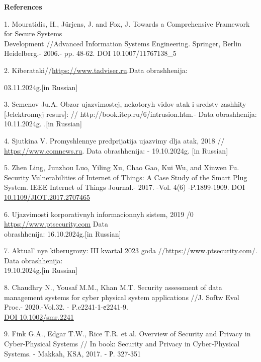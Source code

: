 \begin{center}
{\bfseries References}
\end{center}

\begin{references}
1. Mouratidis, H., Jürjens, J. and Fox, J. Towards a Comprehensive
Framework for Secure Systems \\Development //Advanced Information Systems
Engineering. Springer, Berlin Heidelberg.- 2006.- pp. 48-62. DOI
10.1007/11767138\_5

2. Kiberataki//\href{https://www.tadviser.ru/index.php/Stat'ja:Kiberataki}{https://www.tadviser.ru}.Data obrashhenija:

03.11.2024g.{[}in Russian{]}

3. Semenov Ju.A. Obzor ujazvimostej, nekotoryh vidov atak i sredstv
zashhity {[}Jelektronnyj resurs{]}: //
http://book.itep.ru/6/intrusion.htm.- Data obrashhenija: 10.11.2024g.
.{[}in Russian{]}

4. Sjutkina V. Promyshlennye predprijatija ujazvimy dlja atak, 2018 //
\href{https://www.comnews.ru/content/112938/2018-05-07/promyshlennye-predpriyatiya-uyazvimy-dlya-atak}{https://www.comnews.ru}.
Data obrashhenija: - 19.10.2024g. {[}in Russian{]}

5. Zhen Ling, Junzhou Luo, Yiling Xu, Chao Gao, Kui Wu, and Xinwen Fu.
Security Vulnerabilities of Internet of Things: A Case Study of the
Smart Plug System. IEEE Internet of Things Journal.- 2017. -Vol. 4(6)
-P.1899-1909. DOI
\href{https://doi.org/10.1109/JIOT.2017.2707465}{10.1109/JIOT.2017.2707465}

6. Ujazvimosti korporativnyh informacionnyh sistem, 2019 /0
\href{https://www.ptsecurity.com/ru-ru/research/analytics/corporate-vulnerabilities-2019}{https://www.ptsecurity.com}
Data \\obrashhenija: 16.10.2024g.{[}in Russian{]}

7. Aktual' nye kiberugrozy: III kvartal 2023 goda
//\href{https://www.ptsecurity.com/ru-ru/research/analytics/cybersecurity-threatscape-2023-q3}{https://www.ptsecurity.com}/.
Data obrashhenija: \\19.10.2024g.{[}in Russian{]}

8. Chaudhry N., Yousaf M.M., Khan M.T. Security assessment of data
management systems for cyber physical system applications //J. Softw
Evol Proc.- 2020.-Vol.32. - P.e2241-1-е2241-9.\\
\href{https://doi.org/10.1002/smr.2241}{DOI 10.1002/smr.2241}

9. Fink G.A., Edgar T.W., Rice T.R. et al. Overview of Security and
Privacy in Cyber‐Physical Systems // In book: Security and Privacy in
Cyber‐Physical Systems. - Makkah, KSA, 2017. - Р. 327-351
\end{references}

